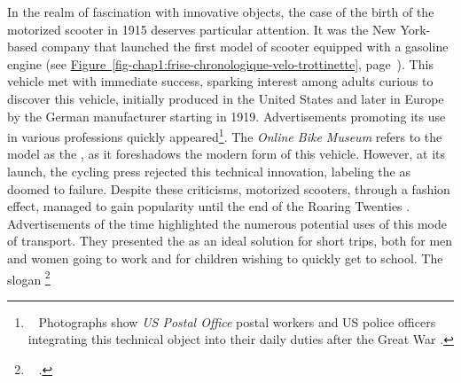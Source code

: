 \begin{refsegment}
In the realm of fascination with innovative objects, the case of the birth of the motorized scooter in 1915 deserves particular attention. It was the New York-based company  that launched the first model of scooter equipped with a gasoline engine (see \hyperref[fig-chap1:frise-chronologique-velo-trottinette]{Figure~\ref{fig-chap1:frise-chronologique-velo-trottinette}}, page~\pageref{fig-chap1:frise-chronologique-velo-trottinette}). This vehicle met with immediate success, sparking interest among adults curious to discover this vehicle, initially produced in the United States and later in Europe by the German manufacturer  starting in 1919. Advertisements promoting its use in various professions quickly appeared\footnote{~
    Photographs show \textsl{US Postal Office} postal workers and US police officers integrating this technical object into their daily duties after the Great War \textcolor{blue}{\autocite{ma_trott_origines_2019}}.
}. The \textsl{Online Bike Museum} refers to the  model as the , as it foreshadows the modern form of this vehicle. However, at its launch, the cycling press rejected this technical innovation, labeling the  as  doomed to failure. Despite these criticisms, motorized scooters, through a fashion effect, managed to gain popularity until the end of the Roaring Twenties \textcolor{blue}{\autocite{smithsonian_magazine_motorized_2019}}. Advertisements of the time highlighted the numerous potential uses of this mode of transport. They presented the  as an ideal solution for short trips, both for men and women going to work and for children wishing to quickly get to school. The slogan \footnote{~
     \textcolor{blue}{\autocite{smithsonian_magazine_motorized_2019}}.
}
\end{refsegment}
